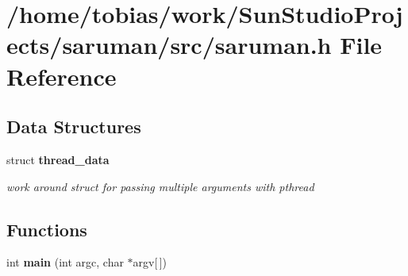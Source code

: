\section{/home/tobias/work/SunStudioProjects/saruman/src/saruman.h File Reference}
\label{saruman_8h}
\subsection*{Data Structures}
\begin{CompactItemize}
\item 
struct {\bf thread\_\-data}
\begin{CompactList}\small\item\em work around struct for passing multiple arguments with pthread \item\end{CompactList}\end{CompactItemize}
\subsection*{Functions}
\begin{CompactItemize}
\item 
int {\bf main} (int argc, char $\ast$argv[$\,$])
\end{CompactItemize}
